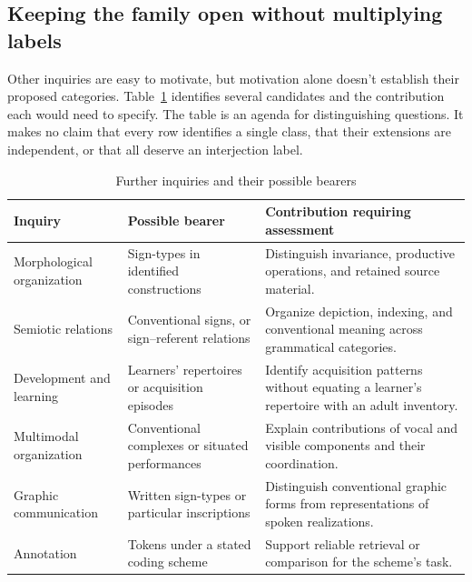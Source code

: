 \documentclass[12pt]{article}
\begin{document}
\subsection{Keeping the family open without multiplying labels}

Other inquiries are easy to motivate, but motivation alone doesn't
establish their proposed categories. Table~\ref{tab:extensions} identifies
several candidates and the contribution each would need to specify.
The table is an agenda for distinguishing questions. It makes no
claim that every row identifies a single class, that their extensions
are independent, or that all deserve an interjection label.

\begin{table}[htbp]
\centering
\small
\caption{Further inquiries and their possible bearers}
\label{tab:extensions}
\begin{tabular}{@{}>{\raggedright\arraybackslash}p{}
                  >{\raggedright\arraybackslash}p{}
                  >{\raggedright\arraybackslash}p{}@{}}
\toprule
Inquiry & Possible bearer & Contribution requiring assessment \\
\midrule
Morphological organization & Sign-types in identified constructions &
Distinguish invariance, productive operations, and retained source material. \\
\addlinespace
Semiotic relations & Conventional signs, or sign--referent relations &
Organize depiction, indexing, and conventional meaning across grammatical categories. \\
\addlinespace
Development and learning & Learners' repertoires or acquisition episodes &
Identify acquisition patterns without equating a learner's repertoire with an adult inventory. \\
\addlinespace
Multimodal organization & Conventional complexes or situated performances &
Explain contributions of vocal and visible components and their coordination. \\
\addlinespace
Graphic communication & Written sign-types or particular inscriptions &
Distinguish conventional graphic forms from representations of spoken realizations. \\
\addlinespace
Annotation & Tokens under a stated coding scheme &
Support reliable retrieval or comparison for the scheme's task. \\
\bottomrule
\end{tabular}
\end{table}
\end{document}
